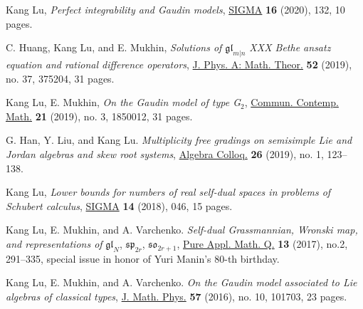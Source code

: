 \documentclass[11pt,letterpaper,roman,colorlinks,urlcolor=teal,linkcolor=teal]{moderncv} %
\begin{document}
\begin{etaremune}[leftmargin=1cm]
\item Kang Lu, \textit{Perfect integrability and Gaudin models}, \href{https://www.emis.de/journals/SIGMA/2020/132/}{SIGMA} \textbf{16} (2020), 132, 10 pages.
  
\item C. Huang, Kang Lu, and E. Mukhin, {\textit{Solutions of $\mathfrak{gl}_{m|n}$ XXX Bethe ansatz equation and rational difference operators}}, \href{https://doi.org/10.1088/1751-8121/ab1960}{J. Phys. A: Math. Theor.} \textbf{52} (2019), no. 37, 375204, 31 pages.	
			
\item Kang Lu, E. Mukhin, {\textit{On the Gaudin model of type G$_2$}}, \href{https://doi.org/10.1142/S0219199718500128}{Commun. Contemp. Math.} \textbf{21} (2019), no. 3, 1850012, 31 pages.

\item G. Han, Y. Liu, and Kang Lu. {\textit{Multiplicity free gradings on semisimple Lie and Jordan algebras and skew root systems}}, \href{https://doi.org/10.1142/S1005386719000129}{Algebra Colloq.} {\textbf{26}} (2019), no. 1, 123--138.
			
\item Kang Lu, {\textit{Lower bounds for numbers of real self-dual spaces in problems of Schubert calculus}}, \href{https://doi.org/10.3842/SIGMA.2018.046}{SIGMA} {\textbf{14}} (2018), 046, 15 pages.	
			
\item Kang Lu, E. Mukhin, and A. Varchenko. 
			{\textit{Self-dual Grassmannian, Wronski map, and representations of} $\mathfrak{gl}_N$, $\mathfrak{sp}_{2r}$, $\mathfrak{so}_{2r+1}$}, \href{http://dx.doi.org/10.4310/PAMQ.2017.v13.n2.a4}{Pure Appl. Math. Q.} {\textbf{13}} (2017), no.2, 291--335, special issue in honor of Yuri Manin's 80-th birthday.
					
\item Kang Lu, E. Mukhin, and A. Varchenko. 
			{\textit{On the Gaudin model associated to Lie algebras of classical types}}, \href{https://doi.org/10.1063/1.4964389}{J. Math. Phys.} {\textbf{57}} (2016), no. 10, 101703, 23 pages.
	    \end{etaremune}
\end{document}
